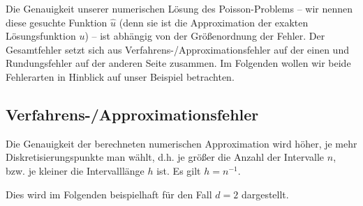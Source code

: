 \documentclass{scrartcl}
\begin{document}
Die Genauigkeit unserer numerischen Lösung des Poisson-Problems -- wir nennen diese gesuchte Funktion $\hat{u}$ (denn sie ist die Approximation der exakten Lösungsfunktion $u$) -- ist abhängig von der Größenordnung der Fehler. Der Gesamtfehler setzt sich aus Verfahrens-/Approximationsfehler auf der einen und Rundungsfehler auf der anderen Seite zusammen\cite{tischendorf2019}. Im Folgenden wollen wir beide Fehlerarten in Hinblick auf unser Beispiel betrachten.

\subsection{Verfahrens-/Approximationsfehler}
Die Genauigkeit der berechneten numerischen Approximation wird höher, je mehr Diskretisierungspunkte man wählt, d.h. je größer die Anzahl der Intervalle $n$, bzw. je kleiner die Intervalllänge $h$ ist. Es gilt $h=n^{-1}$.

Dies wird im Folgenden beispielhaft für den Fall $d=2$ dargestellt.
\end{document}
